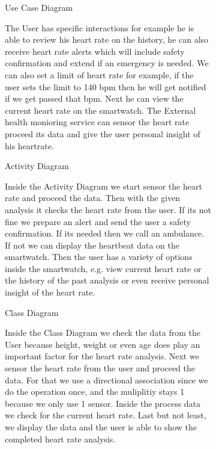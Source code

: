 \documentclass{article}
\begin{document}
\begin{figure}[htbp]
	\centering
	\begin{subfigure}{\textwidth}
		\resizebox{\textwidth}{!}{}
		\caption{Use Case Diagram}
	\end{subfigure}
	\begin{subfigure}{\textwidth}
		The User has specific interactions for example he is able to review his heart rate on the history, he can also receive
		heart rate alerts which will include safety confirmation and extend if an emergency is needed. We can also set a limit of heart rate for example,
		if the user sets the limit to 140 bpm then he will get notified if we get passed that bpm. Next he can view the current heart rate on the smartwatch.
		The External health monioring service can sensor the heart rate proceed its data and give the user personal insight of his heartrate. 
	\end{subfigure}
\end{figure}


\begin{figure}[htbp]
	\centering
	\begin{subfigure}{\textwidth}
		\resizebox{\textwidth}{!}{}
		\caption{Activity Diagram}
	\end{subfigure}
	\begin{subfigure}{\textwidth}
		Inside the Activity Diagram we start sensor the heart rate and proceed the data. Then with the given analysis it checks the 
		heart rate from the user. If its not fine we prepare an alert and send the user a safety confirmation. If its needed then we call an ambulance. If not 
		we can display the heartbeat data on the smartwatch. Then the user has a variety of options inside the smartwatch, e.g. 
		view current heart rate or the history of the past analysis or even receive personal insight of the heart rate. 
	\end{subfigure}
\end{figure}


\begin{figure}[htbp]
	\centering
	\begin{subfigure}{\textwidth}
		\resizebox{\textwidth}{!}{}
		\caption{Class Diagram}
	\end{subfigure}
	\begin{subfigure}{\textwidth}
		Inside the Class Diagram we check the data from the User because height, weight or even age does play an important factor
		for the heart rate analysis. Next we sensor the heart rate from the user and proceed the data. For that we use a directional 
		association since we do the operation once, and the muliplitiy stays 1 because we only use 1 sensor. Inside the process data we check for 
		the current heart rate. Last but not least, we display the data and the user is able to show the completed heart rate 
		analysis. 
	\end{subfigure}
\end{figure}
\end{document}
